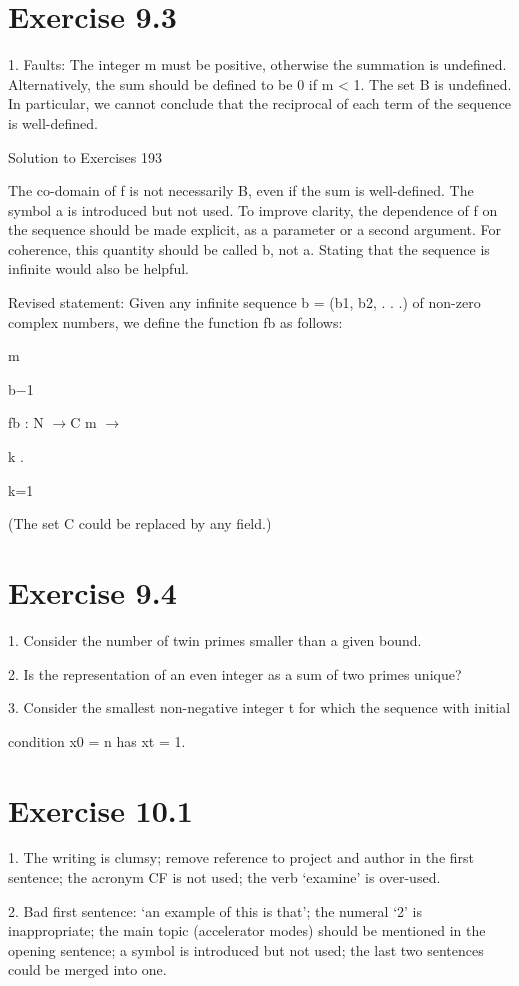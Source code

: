 \documentclass[11pt]{article}
\theoremstyle{plain}
\theoremstyle{definition}
\begin{document}
\section{Exercise 9.3}

1. Faults: The integer m must be positive, otherwise the summation is undefined. Alternatively, the sum should be defined to be 0 if m < 1. The set B is undefined. In particular, we cannot conclude that the reciprocal of each term of the sequence is well-defined.

Solution to Exercises 193

The co-domain of f is not necessarily B, even if the sum is well-defined. The symbol a is introduced but not used. To improve clarity, the dependence of f on the sequence should be made explicit, as a parameter or a second argument. For coherence, this quantity should be called b, not a. Stating that the sequence is infinite would also be helpful.

Revised statement: Given any infinite sequence b = (b1, b2, . . .) of non-zero complex numbers, we define the function fb as follows:

m

b$-$1

fb : N $\to$C m $\to$

k .

k=1

(The set C could be replaced by any field.)

\section{Exercise 9.4}

1. Consider the number of twin primes smaller than a given bound.

2. Is the representation of an even integer as a sum of two primes unique?

3. Consider the smallest non-negative integer t for which the sequence with initial

condition x0 = n has xt = 1.

\section{Exercise 10.1}

1. The writing is clumsy; remove reference to project and author in the first sentence; the acronym CF is not used; the verb `examine' is over-used.

2. Bad first sentence: `an example of this is that'; the numeral `2' is inappropriate; the main topic (accelerator modes) should be mentioned in the opening sentence; a symbol is introduced but not used; the last two sentences could be merged into one.
\end{document}
